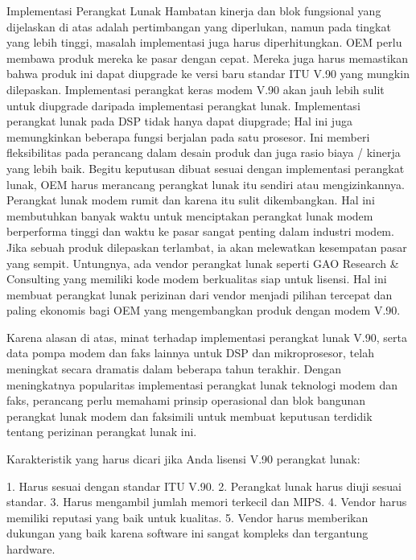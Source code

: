 Implementasi Perangkat Lunak
Hambatan kinerja dan blok fungsional yang dijelaskan di atas adalah pertimbangan yang diperlukan, namun pada tingkat yang lebih tinggi, masalah implementasi juga harus diperhitungkan. OEM perlu membawa produk mereka ke pasar dengan cepat. Mereka juga harus memastikan bahwa produk ini dapat diupgrade ke versi baru standar ITU V.90 yang mungkin dilepaskan. Implementasi perangkat keras modem V.90 akan jauh lebih sulit untuk diupgrade daripada implementasi perangkat lunak. Implementasi perangkat lunak pada DSP tidak hanya dapat diupgrade; Hal ini juga memungkinkan beberapa fungsi berjalan pada satu prosesor. Ini memberi fleksibilitas pada perancang dalam desain produk dan juga rasio biaya / kinerja yang lebih baik. Begitu keputusan dibuat sesuai dengan implementasi perangkat lunak, OEM harus merancang perangkat lunak itu sendiri atau mengizinkannya. Perangkat lunak modem rumit dan karena itu sulit dikembangkan. Hal ini membutuhkan banyak waktu untuk menciptakan perangkat lunak modem berperforma tinggi dan waktu ke pasar sangat penting dalam industri modem. Jika sebuah produk dilepaskan terlambat, ia akan melewatkan kesempatan pasar yang sempit. Untungnya, ada vendor perangkat lunak seperti GAO Research & Consulting yang memiliki kode modem berkualitas siap untuk lisensi. Hal ini membuat perangkat lunak perizinan dari vendor menjadi pilihan tercepat dan paling ekonomis bagi OEM yang mengembangkan produk dengan modem V.90.

Karena alasan di atas, minat terhadap implementasi perangkat lunak V.90, serta data pompa modem dan faks lainnya untuk DSP dan mikroprosesor, telah meningkat secara dramatis dalam beberapa tahun terakhir. Dengan meningkatnya popularitas implementasi perangkat lunak teknologi modem dan faks, perancang perlu memahami prinsip operasional dan blok bangunan perangkat lunak modem dan faksimili untuk membuat keputusan terdidik tentang perizinan perangkat lunak ini.

\sectionkarakteristik
Karakteristik yang harus dicari jika Anda lisensi V.90 perangkat lunak:

1. Harus sesuai dengan standar ITU V.90.
2. Perangkat lunak harus diuji sesuai standar.
3. Harus mengambil jumlah memori terkecil dan MIPS.
4. Vendor harus memiliki reputasi yang baik untuk kualitas.
5. Vendor harus memberikan dukungan yang baik karena software ini sangat kompleks dan tergantung hardware.
